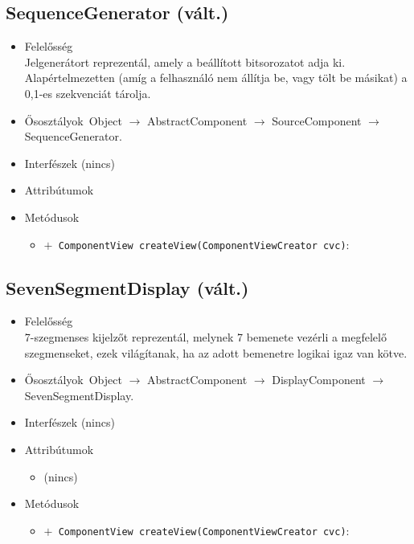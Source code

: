 \subsection{SequenceGenerator (vált.)}
\begin{itemize}
\item Felelősség\\
Jelgenerátort reprezentál, amely a beállított bitsorozatot adja ki.  Alapértelmezetten (amíg a felhasználó nem állítja be, vagy tölt be másikat) a 0,1-es  szekvenciát tárolja.
\item Ősosztályok\ Object $\rightarrow{}$ AbstractComponent $\rightarrow{}$ SourceComponent $\rightarrow{}$ SequenceGenerator.
\item Interfészek (nincs)
\item Attribútumok $\ $
\item Metódusok$\ $
\begin{itemize}
	\item[] \texttt{$+$ ComponentView createView(ComponentViewCreator cvc)}: 
\end{itemize}
\end{itemize}

\subsection{SevenSegmentDisplay (vált.)}
\begin{itemize}
\item Felelősség\\
7-szegmenses kijelzőt reprezentál, melynek 7 bemenete vezérli a  megfelelő szegmenseket, ezek világítanak, ha az adott bemenetre logikai  igaz van kötve.
\item Ősosztályok\ Object $\rightarrow{}$ AbstractComponent $\rightarrow{}$ DisplayComponent $\rightarrow{}$ SevenSegmentDisplay.
\item Interfészek (nincs)
\item Attribútumok $\ $
\begin{itemize}
\item (nincs)
\end{itemize}
\item Metódusok$\ $
\begin{itemize}
	\item[] \texttt{$+$ ComponentView createView(ComponentViewCreator cvc)}: 
\end{itemize}
\end{itemize}

